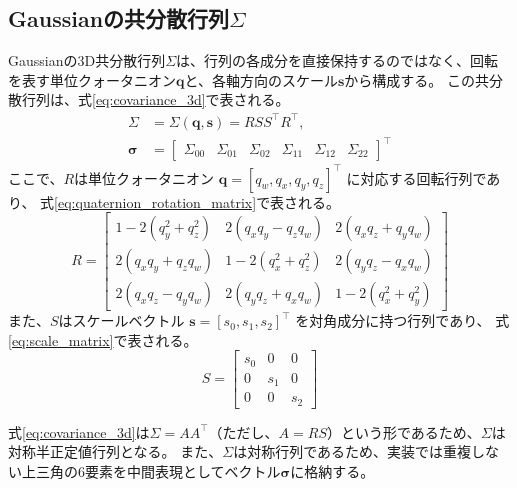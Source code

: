 \documentclass[dvipdfmx]{jlreq}
\begin{document}
\subsection{Gaussianの共分散行列$\Sigma$}
Gaussianの3D共分散行列$\Sigma$は、行列の各成分を直接保持するのではなく、回転を表す単位クォータニオン$\bm{q}$と、各軸方向のスケール$\bm{s}$から構成する。
この共分散行列は、式\eqref{eq:covariance_3d}で表される。
\begin{equation}
    \begin{aligned}
        \Sigma &= \Sigma(\bm{q},\bm{s}) = RSS^{\top}R^{\top}, \\
        \bm{\sigma}
        &= \begin{bmatrix}
            \Sigma_{00} & \Sigma_{01} & \Sigma_{02} &
            \Sigma_{11} & \Sigma_{12} & \Sigma_{22}
        \end{bmatrix}^{\top}
    \end{aligned}
    \label{eq:covariance_3d}
\end{equation}
ここで、$R$は単位クォータニオン
$\bm{q}=[q_w,q_x,q_y,q_z]^{\top}$
に対応する回転行列であり、
式\eqref{eq:quaternion_rotation_matrix}で表される。
\begin{equation}
    R = \begin{bmatrix}
        1-2(q_y^2+q_z^2) & 2(q_xq_y-q_zq_w) & 2(q_xq_z+q_yq_w) \\
        2(q_xq_y+q_zq_w) & 1-2(q_x^2+q_z^2) & 2(q_yq_z-q_xq_w) \\
        2(q_xq_z-q_yq_w) & 2(q_yq_z+q_xq_w) & 1-2(q_x^2+q_y^2)
    \end{bmatrix}
    \label{eq:quaternion_rotation_matrix}
\end{equation}
また、$S$はスケールベクトル
$\bm{s}=[s_0,s_1,s_2]^{\top}$
を対角成分に持つ行列であり、
式\eqref{eq:scale_matrix}で表される。
\begin{equation}
    S= \begin{bmatrix} s_0 & 0 & 0 \\ 0 & s_1 & 0 \\ 0 & 0 & s_2 \end{bmatrix}
    \label{eq:scale_matrix}
\end{equation}

式\eqref{eq:covariance_3d}は$\Sigma=AA^{\top}$（ただし、$A=RS$）という形であるため、$\Sigma$は対称半正定値行列となる。
また、$\Sigma$は対称行列であるため、実装では重複しない上三角の6要素を中間表現としてベクトル$\bm{\sigma}$に格納する。
\end{document}
